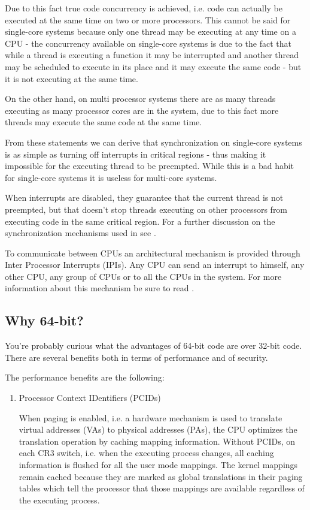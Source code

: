\begin{appendices}
Due to this fact true code concurrency is achieved, i.e. code can actually be executed at the same
time on two or more processors. This cannot be said for single-core systems because only one thread
may be executing at any time on a CPU - the concurrency available on single-core systems is due to
the fact that while a thread is executing a function it may be interrupted and another thread may
be scheduled to execute in its place and it may execute the same code - but it is not executing at
the same time.

On the other hand, on multi processor systems there are as many threads executing as many processor
cores are in the system, due to this fact more threads may execute the same code at the same time.

From these statements we can derive that synchronization on single-core systems is as simple as
turning off interrupts in critical regions - thus making it impossible for the executing thread to
be preempted. While this is a bad habit for single-core systems it is useless for multi-core systems.

When interrupts are disabled, they guarantee that the current thread is not preempted, but that
doesn't stop threads executing on other processors from executing code in the same critical region.
For a further discussion on the synchronization mechanisms used in \projectname see
.

To communicate between CPUs an architectural mechanism is provided through Inter Processor
Interrupts (IPIs). Any CPU can send an interrupt to himself, any other CPU, any group of CPUs or
to all the CPUs in the system. For more information about this mechanism be sure to read .

\subsection{Why 64-bit?}
\label{sect:Why64}

You're probably curious what the advantages of 64-bit code are over 32-bit code. There are several
benefits both in terms of performance and of security.

The performance benefits are the following:
\begin{enumerate}
	\item Processor Context IDentifiers (PCIDs)

	When paging is enabled, i.e. a hardware mechanism is used to translate virtual addresses (VAs)
to physical addresses (PAs), the CPU optimizes the translation operation by caching mapping
information. Without PCIDs, on each CR3 switch, i.e. when the executing process changes, all
caching information is flushed for all the user mode mappings. The kernel mappings remain cached
because they are marked as global translations in their paging tables which tell the processor that
those mappings are available regardless of the executing process.


\end{enumerate}
\end{appendices}
